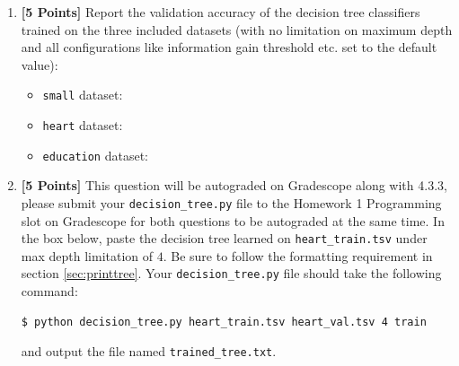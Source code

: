 \begin{enumerate}
    \item {\bf [5 Points]} Report the validation accuracy of the decision tree classifiers trained on the three included datasets (with no limitation on maximum depth and all configurations like information gain threshold etc. set to the default value):

        \begin{itemize}
            \item \texttt{small} dataset: 
            \begin{tcolorbox}[fit,height=0.5cm, width=3cm, blank, borderline={1pt}{-2pt},nobeforeafter]
            \end{tcolorbox}

            
            \item \texttt{heart} dataset:
            \begin{tcolorbox}[fit,height=0.5cm, width=3cm, blank, borderline={1pt}{-2pt},nobeforeafter]
            \end{tcolorbox}

            
            \item \texttt{education} dataset: 
            \begin{tcolorbox}[fit,height=0.5cm, width=3cm, blank, borderline={1pt}{-2pt},nobeforeafter]
            \end{tcolorbox}

        \end{itemize}

    \item {\bf [5 Points]} This question will be autograded on Gradescope along with 4.3.3, please submit your \texttt{decision\_tree.py} file to the Homework 1 Programming slot on Gradescope for both questions to be autograded at the same time. In the box below, paste the decision tree learned on \texttt{heart\_train.tsv} under max depth limitation of $4$. Be sure to follow the formatting requirement in section \ref{sec:printtree}. Your \texttt{decision\_tree.py} file should take the following command: 
    \begin{lstlisting}[language=Shell]
$ python decision_tree.py heart_train.tsv heart_val.tsv 4 train
\end{lstlisting} 
    and output the file named \texttt{trained\_tree.txt}.
    



\end{enumerate}
